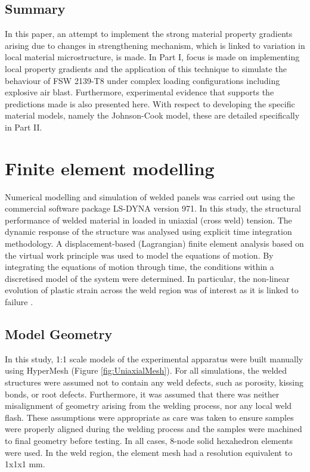 \subsection{Summary}
\label{IntroSummary}
In this paper, an attempt to implement the strong material property gradients arising due to changes in strengthening mechanism, which is linked to variation in local material microstructure, is made. In Part I, focus is made on implementing local property gradients and the application of this technique to simulate the behaviour of FSW 2139-T8 under complex loading configurations including explosive air blast. Furthermore, experimental evidence that supports the predictions made is also presented here. With respect to developing the specific material models, namely the Johnson-Cook model, these are detailed specifically in Part II. 

\section{Finite element modelling}
\label{FE}
Numerical modelling and simulation of welded panels was carried out using the commercial software package LS-DYNA version 971. In this study, the structural performance of welded material in loaded in uniaxial (cross weld) tension. The dynamic response of the structure was analysed using explicit time integration methodology. A displacement-based (Lagrangian) finite element analysis based on the virtual work principle was used to model the equations of motion. By integrating the equations of motion through time, the conditions within a discretised model of the system were determined. In particular, the non-linear evolution of plastic strain across the weld region was of interest as it is linked to failure \cite{Chien2003f}. 
\subsection{Model Geometry}
\label{FEModelGeometry}
In this study, 1:1 scale models of the experimental apparatus were built manually using HyperMesh (Figure \ref{fig:UniaxialMesh}). For all simulations, the welded structures were assumed not to contain any weld defects, such as porosity, kissing bonds, or root defects. Furthermore, it was assumed that there was neither misalignment of geometry arising from the welding process, nor any local weld flash. These assumptions were appropriate as care was taken to ensure samples were properly aligned during the welding process and the samples were machined to final geometry before testing. In all cases, 8-node solid hexahedron elements were used. In the weld region, the element mesh had a resolution equivalent to 1x1x1 mm. 

